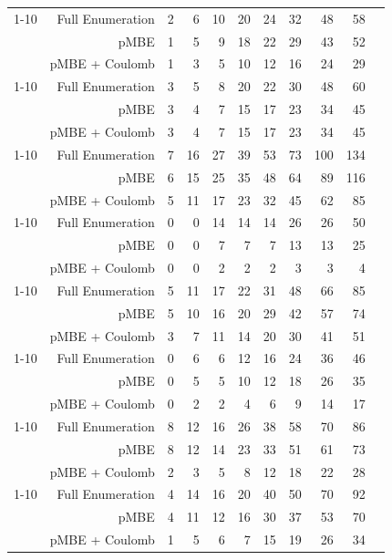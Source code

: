 \begin{longtable}{lrrrrrrrrrr}
\cline{1-10}
\multirow[c]{3}{*}{Cytosine} & Full Enumeration & 2 & 6 & 10 & 20 & 24 & 32 & 48 & 58 \\
 & pMBE & 1 & 5 & 9 & 18 & 22 & 29 & 43 & 52 \\
 & pMBE + Coulomb & 1 & 3 & 5 & 10 & 12 & 16 & 24 & 29 \\
\cline{1-10}
\multirow[c]{3}{*}{Ethyl carbamate} & Full Enumeration & 3 & 5 & 8 & 20 & 22 & 30 & 48 & 60 \\
 & pMBE & 3 & 4 & 7 & 15 & 17 & 23 & 34 & 45 \\
 & pMBE + Coulomb & 3 & 4 & 7 & 15 & 17 & 23 & 34 & 45 \\
\cline{1-10}
\multirow[c]{3}{*}{Formamide} & Full Enumeration & 7 & 16 & 27 & 39 & 53 & 73 & 100 & 134 \\
 & pMBE & 6 & 15 & 25 & 35 & 48 & 64 & 89 & 116 \\
 & pMBE + Coulomb & 5 & 11 & 17 & 23 & 32 & 45 & 62 & 85 \\
\cline{1-10}
\multirow[c]{3}{*}{Hexamine} & Full Enumeration & 0 & 0 & 14 & 14 & 14 & 26 & 26 & 50 \\
 & pMBE & 0 & 0 & 7 & 7 & 7 & 13 & 13 & 25 \\
 & pMBE + Coulomb & 0 & 0 & 2 & 2 & 2 & 3 & 3 & 4 \\
\cline{1-10}
\multirow[c]{3}{*}{Imidazole} & Full Enumeration & 5 & 11 & 17 & 22 & 31 & 48 & 66 & 85 \\
 & pMBE & 5 & 10 & 16 & 20 & 29 & 42 & 57 & 74 \\
 & pMBE + Coulomb & 3 & 7 & 11 & 14 & 20 & 30 & 41 & 51 \\
\cline{1-10}
\multirow[c]{3}{*}{Naphthalene} & Full Enumeration & 0 & 6 & 6 & 12 & 16 & 24 & 36 & 46 \\
 & pMBE & 0 & 5 & 5 & 10 & 12 & 18 & 26 & 35 \\
 & pMBE + Coulomb & 0 & 2 & 2 & 4 & 6 & 9 & 14 & 17 \\
\cline{1-10}
\multirow[c]{3}{*}{Oxalic Acid $\alpha$} & Full Enumeration & 8 & 12 & 16 & 26 & 38 & 58 & 70 & 86 \\
 & pMBE & 8 & 12 & 14 & 23 & 33 & 51 & 61 & 73 \\
 & pMBE + Coulomb & 2 & 3 & 5 & 8 & 12 & 18 & 22 & 28 \\
\cline{1-10}
\multirow[c]{3}{*}{Oxalic Acid $\beta$} & Full Enumeration & 4 & 14 & 16 & 20 & 40 & 50 & 70 & 92 \\
 & pMBE & 4 & 11 & 12 & 16 & 30 & 37 & 53 & 70 \\
 & pMBE + Coulomb & 1 & 5 & 6 & 7 & 15 & 19 & 26 & 34 \\

\end{longtable}

